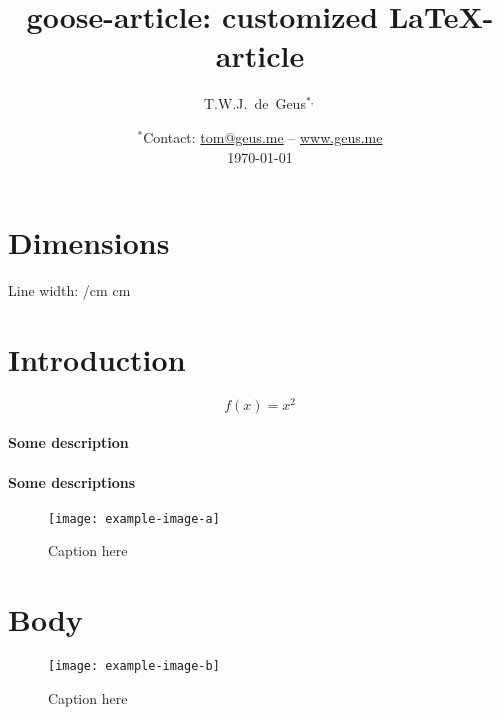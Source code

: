 \documentclass{goose-article}
\title{goose-article: customized \LaTeX-article}
\author[1]{T.W.J.~de~Geus$^{*,}$}
\affil[1]{
    Physics Institute,
    \'{E}cole Polytechnique F\'{e}d\'{e}rale de Lausanne (EPFL) \nl
    Switzerland
}
\date{
    $^*$Contact:
    \href{mailto:tom@geus.me}{tom@geus.me}
    \hspace{1mm}--\hspace{1mm}
    \href{http://www.geus.me}{www.geus.me}
    \\
    \today
}
\begin{document}
\maketitle

\begin{abstract}
    \noindent
    \lipsum[1]

\end{abstract}

\section{Dimensions}

\makeatletter
\def\convertto#1#2{\strip@pt\dimexpr #2*65536/\number{}#1}
\makeatother
Line width: \convertto{cm}{\the\linewidth} cm

\section{Introduction}

\lipsum[2-4] \cite{Geus10,Geus11,Geus12,Geus13,Geus14,Geus15,Geus16,Geus17,Geus19}
\begin{equation}
    f(x) = x^2
\end{equation}

\paragraph{Some description}
\lipsum[5]

\paragraph{Some descriptions}
\lipsum[6]

\begin{figure}[htp]
    \centering
    \texttt{[image: example-image-a]}
    \caption{Caption here}
    \label{fig:a}
\end{figure}

\section{Body}

\lipsum[7-12]

\begin{figure}[htp]
    \centering
    \texttt{[image: example-image-b]}
    \caption{Caption here}
    \label{fig:b}
\end{figure}



\end{document}

